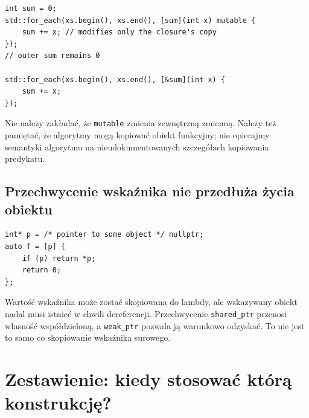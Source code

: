 \begin{lstlisting}
int sum = 0;
std::for_each(xs.begin(), xs.end(), [sum](int x) mutable {
    sum += x; // modifies only the closure's copy
});
// outer sum remains 0

std::for_each(xs.begin(), xs.end(), [&sum](int x) {
    sum += x;
});
\end{lstlisting}

Nie należy zakładać, że \texttt{mutable} zmienia zewnętrzną
zmienną. Należy też pamiętać, że algorytmy
mogą kopiować obiekt funkcyjny; nie opierajmy semantyki algorytmu
na nieudokumentowanych szczegółach kopiowania predykatu.

\subsection{Przechwycenie wskaźnika nie przedłuża życia obiektu}

\begin{lstlisting}
int* p = /* pointer to some object */ nullptr;
auto f = [p] {
    if (p) return *p;
    return 0;
};
\end{lstlisting}

Wartość wskaźnika może zostać skopiowana do lambdy, ale wskazywany
obiekt nadal musi istnieć w chwili dereferencji. Przechwycenie
\texttt{shared\_ptr} przenosi własność współdzieloną, a
\texttt{weak\_ptr} pozwala ją warunkowo odzyskać. To nie jest to
samo co skopiowanie wskaźnika surowego.

\section{Zestawienie: kiedy stosować którą konstrukcję?}

